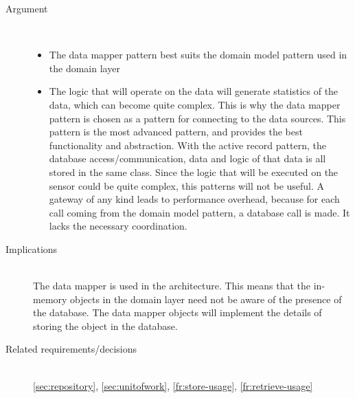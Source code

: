 \begin{description}
\item [Argument]~\\
\begin{itemize}
\item The data mapper pattern best suits the domain model pattern used in the domain layer
\item The logic that will operate on the data will generate statistics of the data, which can become quite complex. This is why the data mapper pattern is chosen as a pattern for connecting to the data sources. This pattern is the most advanced pattern, and provides the best functionality and abstraction.
With the active record pattern, the database access/communication, data and logic of that data is all stored in the same class. Since the logic that will be executed on the sensor could be quite complex, this patterns will not be useful.
A gateway of any kind leads to performance overhead, because for each call coming from the domain model pattern, a database call is made. It lacks the necessary coordination.
\end{itemize}


\item [Implications]~\\
The data mapper is used in the architecture. This means that the in-memory objects in the domain layer need not be aware of the presence of the database.
The data mapper objects will implement the details of storing the object in the database.

\item [Related requirements/decisions]~\\
\ref{sec:repository},  \ref{sec:unitofwork}, \ref{fr:store-usage}, \ref{fr:retrieve-usage}

\end{description}
